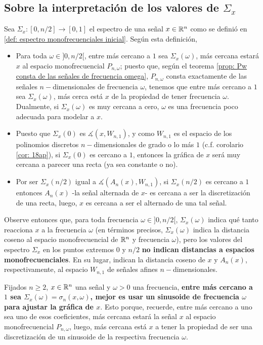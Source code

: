 \subsection{Sobre la interpretación de los valores de $\Sigma_{x}$}
Sea $\Sigma_{x}:[0, n/2] \longrightarrow [0,1]$ el espectro 
de una señal $x \in \mathbb{R}^{n}$
como se definió en \ref{def: espectro monofrecuenciales inicial}.
Según esta definición,
\begin{itemize}
	\item Para toda $\omega \in ]0, n/2[$, entre más cercano 
	a $1$ sea $\Sigma_{x}(\omega)$, más cercana estará $x$
	al espacio monofrecuencial $P_{n, \omega}$; puesto que,
	según el teorema \ref{prop: Pw consta de las señales de frecuencia omega},
	$P_{n, \omega}$ consta exactamente de las señales 
	$n-$dimensionales de frecuencia $\omega$, tenemos que 
	entre más cercano a $1$ sea $\Sigma_{x}(\omega)$, más cerca
	está $x$ de la propiedad de tener frecuencia $\omega$. Dualmente,
	si $\Sigma_{x}(\omega)$ es muy cercana a cero, $\omega$ es una frecuencia
	poco adecuada para modelar a $x$.
	
	\item Puesto que $\Sigma_{x}(0)$ es  $\measuredangle(x, W_{n,1})$, 
	y como $W_{n,1}$ es el espacio de los polinomios discretos
	$n-$dimensionales de grado o lo más $1$ (c.f. 
	corolario \ref{cor: 18ap}),
	si $\Sigma_{x}(0)$ es cercano a $1$, entonces la gráfica de
	$x$ será muy cercana a parecer una recta (ya sea constante o no).
	
	\item Por ser $\Sigma_{x}(n/2)$ igual a  $\measuredangle(A_{n}(x), W_{n,1})$,
	si $\Sigma_{x}(n/2)$ es cercano a $1$ entonces $A_{n}(x)$ -la señal 
	alternada de $x$- es cercana a ser la discretización de una recta, luego,
	$x$ es cercana a ser el alternado de una tal señal.
	
\end{itemize}

Observe entonces que, para toda frecuencia $\omega \in ]0, n/2[$,
$\Sigma_{x}(\omega)$ indica qué tanto reacciona $x$ a la frecuencia
$\omega$ (en términos precisos, $\Sigma_{x}(\omega)$ indica la distancia
coseno al espacio monofrecuencial de $\mathbb{R}^{n}$ y frecuencia $\omega$),
pero los valores del espectro $\Sigma_{x}$ en los puntos 
extremos $0$ y $n/2$ \textbf{no indican distancias a espacios monofrecuenciales}.
En su lugar, indican la distancia coseno de $x$ y $A_{n}(x)$, respectivamente,
al espacio $W_{n,1}$ de señales afines $n-$dimensionales.


\begin{nota}
\label{nota: la mejor frecuencia}
Fijados $n \geq 2$,
$x \in \mathbb{R}^{n}$ una señal y
$\omega >0$ una frecuencia, \textbf{entre más cercano a $1$ sea 
$\Sigma_{x}(\omega) = \sigma_{n}(x, \omega)$, mejor es usar un sinusoide
de frecuencia $\omega$ para ajustar la gráfica de $x$}.
Esto porque, recuerde, entre más cercano a uno sea uno de
esos coeficientes, más cercana estará la señal $x$ 
al espacio monofrecuencial $P_{n, \omega}$, luego, más
cercana está $x$
a tener
la propiedad de ser una discretización de un sinusoide
de la respectiva frecuencia $\omega$.
\end{nota}
